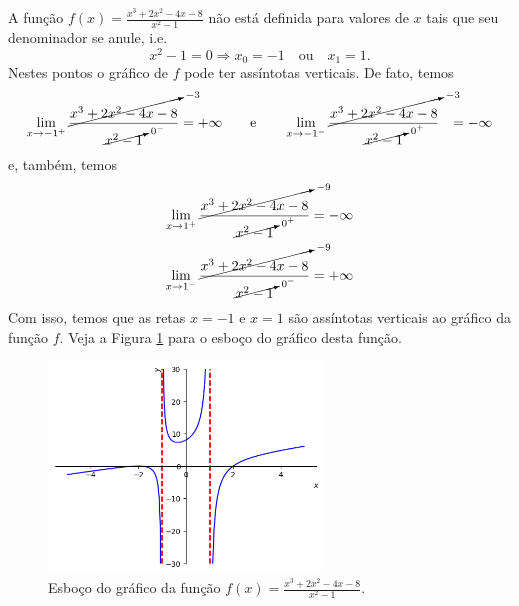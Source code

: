 \cleardoublepage\documentclass[../main.tex]{subfiles}
\begin{document}
\begin{ex}
  A função $\displaystyle f(x) = \frac{x^3 + 2x^2 - 4x - 8}{x^2 - 1}$ não está definida para valores de $x$ tais que seu denominador se anule, i.e.
    \begin{equation*}
      x^2 - 1 = 0 \Rightarrow x_0=-1\quad\text{ou}\quad x_1=1.
    \end{equation*}
    Nestes pontos o gráfico de $f$ pode ter assíntotas verticais. De fato, temos
    \begin{align*}
      \lim_{x\to -1^+} \frac{\cancelto{-3}{x^3 + 2x^2 - 4x - 8}}{\cancelto{0^-}{x^2-1}} &=  +\infty\quad & \textrm{e}\qquad &
      \lim_{x\to -1^-} \frac{\cancelto{-3}{x^3 + 2x^2 - 4x - 8}}{\cancelto{0^+}{x^2-1}} &=  -\infty
    \end{align*}
    e, também, temos
    \begin{align*}
      \lim_{x\to 1^+} \frac{\cancelto{-9}{x^3 + 2x^2 - 4x - 8}}{\cancelto{0^+}{x^2-1}} &= -\infty\\      
      \lim_{x\to 1^-} \frac{\cancelto{-9}{x^3 + 2x^2 - 4x - 8}}{\cancelto{0^-}{x^2-1}} &= +\infty
    \end{align*}
    Com isso, temos que as retas $x=-1$ e $x=1$ são assíntotas verticais ao gráfico da função $f$. Veja a Figura \ref{fig:ex_lim_assvert_racio} para o esboço do gráfico desta função.
    \begin{figure}[H]
      \centering
      \includegraphics[width=0.65\textwidth]{fig_lim/fig_ex_lim_assvert_racio}
      \caption{Esboço do gráfico da função $\displaystyle f(x) = \frac{x^3 + 2x^2 - 4x - 8}{x^2 - 1}$.}
      \label{fig:ex_lim_assvert_racio}
    \end{figure}
\end{ex}
\end{document}
